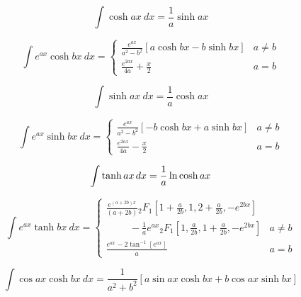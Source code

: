 \documentclass[12pt,a4paper,leqno]{article}
\begin{document}
  \begin{equation}
  \int \cosh ax\ dx =\frac{1}{a} \sinh ax
  \end{equation}

  \begin{equation}
  \int e^{ax}  \cosh bx \ dx =
  \begin{cases}
  \displaystyle{\frac{e^{ax}}{a^2-b^2} }[ a \cosh bx - b \sinh bx ]  & a\ne b \\
  \displaystyle{\frac{e^{2ax}}{4a} + \frac{x}{2}}  & a = b
  \end{cases}
  \end{equation}

  \begin{equation}
  \int \sinh ax\ dx = \frac{1}{a} \cosh ax
  \end{equation}

  \begin{equation}
  \int e^{ax} \sinh bx \ dx =
  \begin{cases}
  \displaystyle{\frac{e^{ax}}{a^2-b^2} }[ -b \cosh bx + a \sinh bx ]  & a\ne b \\
  \displaystyle{\frac{e^{2ax}}{4a} - \frac{x}{2}}  & a = b
  \end{cases}
  \end{equation}


  \begin{equation}\label{eq:yates}
  \int  \tanh ax\hspace{1.5pt} dx =\frac{1}{a} \ln \cosh ax
  \end{equation}

  \begin{equation}\label{eq:dewitt}
  \int  e^{ax} \tanh bx\ dx =
  \begin{cases}
  \displaystyle{ \frac{ e^{(a+2b)x}}{(a+2b)}
  {_2F_1}\left[ 1+\frac{a}{2b},1,2+\frac{a}{2b}, -e^{2bx}\right] }& \\
  \displaystyle{
  \hspace{1cm}-\frac{1}{a}e^{ax}{_2F_1}\left[ 1, \frac{a}{2b},1+\frac{a}{2b}, -e^{2bx}\right]
  }
   & a\ne b \\
  \displaystyle{\frac{e^{ax}-2\tan^{-1}[e^{ax}]}{a} } & a = b
  \end{cases}
  \end{equation}



  \begin{equation}
  \int \cos ax \cosh bx\ dx =
  \frac{1}{a^2 + b^2} \left[
  a \sin ax \cosh bx  + b \cos ax \sinh bx
  \right]
  \end{equation}
\end{document}
